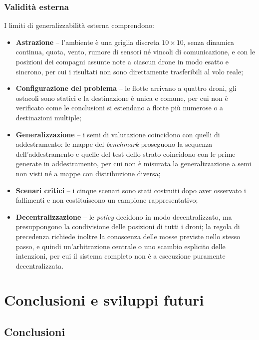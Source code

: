 \documentclass[12pt,a4paper,twoside]{report}
\newcommand{\paginabianca}{\clearpage\null\thispagestyle{empty}\clearpage}
\begin{document}
\subsection{Validità esterna}
I limiti di generalizzabilità esterna comprendono:
\begin{itemize}
    \item \textbf{Astrazione} -- l'ambiente è una griglia discreta $10 \times 10$, senza dinamica continua, quota, vento, rumore di sensori né vincoli di comunicazione, e con le posizioni dei compagni assunte note a ciascun drone in modo esatto e sincrono, per cui i risultati non sono direttamente trasferibili al volo reale;
    \item \textbf{Configurazione del problema} -- le flotte arrivano a quattro droni, gli ostacoli sono statici e la destinazione è unica e comune, per cui non è verificato come le conclusioni si estendano a flotte più numerose o a destinazioni multiple;
    \item \textbf{Generalizzazione} -- i semi di valutazione coincidono con quelli di addestramento: le mappe del \emph{benchmark} proseguono la sequenza dell'addestramento e quelle del test dello strato coincidono con le prime generate in addestramento, per cui non è misurata la generalizzazione a semi non visti né a mappe con distribuzione diversa;
    \item \textbf{Scenari critici} -- i cinque scenari sono stati costruiti dopo aver osservato i fallimenti e non costituiscono un campione rappresentativo;
    \newpage
    \item \textbf{Decentralizzazione} -- le \emph{policy} decidono in modo decentralizzato, ma presuppongono la condivisione delle posizioni di tutti i droni; la regola di precedenza richiede inoltre la conoscenza delle mosse previste nello stesso passo, e quindi un'arbitrazione centrale o uno scambio esplicito delle intenzioni, per cui il sistema completo non è a esecuzione puramente decentralizzata.
\end{itemize}

\paginabianca
\chapter{Conclusioni e sviluppi futuri}
\label{chap:conclusioni}

\section{Conclusioni}
\label{sec:conclusioni}
\end{document}
